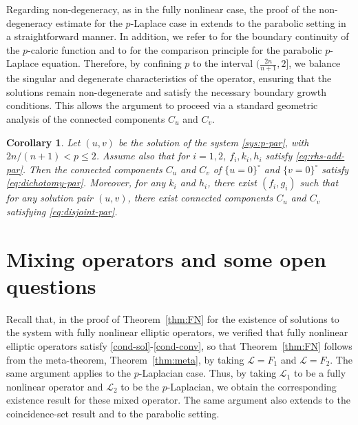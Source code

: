 \documentclass[11pt,oneside,english]{amsart}
\newcommand{\cL}{{\mathcal L}}
\numberwithin{equation}{section}
\theoremstyle{plain}
\newtheorem{corollary}{Corollary}
\numberwithin{equation}{section}
\begin{document}
Regarding non-degeneracy, as in the fully nonlinear case, the proof of the non-degeneracy estimate for the $p$-Laplace case in \cite[(2.14)]{JeoSha24} extends to the parabolic setting in a straightforward manner.
In addition, we refer to \cite[Theorem~1.2 in Chapter {\rm III}]{DiB93} for the boundary continuity of the $p$-caloric function and to \cite[Theorem~3.1 in Chapter {\rm VI}]{DiB93} for the comparison principle for the parabolic $p$-Laplace equation.
Therefore, by confining $p$ to the interval $(\frac{2n}{n+1}, 2]$, we balance the singular and degenerate characteristics of the operator, ensuring that the solutions remain non-degenerate and satisfy the necessary boundary growth conditions. This allows the argument to proceed via a standard geometric analysis of the connected components $C_u$ and $C_v$.






    \begin{corollary}\label{cor:p-par-coin}
  Let $(u,v)$ be the solution of the system \eqref{sys:p-par}, with $ 2n/(n+1)<p\leq 2 $.
 Assume also that for  $i=1,2$, $f_i, k_i,h_i$ satisfy \eqref{eq:rhs-add-par}.  Then the connected components  $C_u$ and $C_v$ of  $\{u=0\}^\circ$ and $\{v=0\}^\circ$ satisfy
  \eqref{eq:dichotomy-par}. Moreover, for any $k_i$ and $h_i$, there exist $(f_i,g_i)$ such that for any solution pair  $(u,v)$, there exist connected components $C_u$ and $C_v$  satisfying \eqref{eq:disjoint-par}.
\end{corollary}




\section{Mixing operators and some open questions}\label{sec:mix}

Recall that, in the proof of Theorem~\ref{thm:FN} for the existence of solutions to the system with fully nonlinear elliptic operators, we verified that fully nonlinear elliptic operators satisfy \ref{cond-sol}-\ref{cond-conv}, so that Theorem~\ref{thm:FN} follows from the meta-theorem, Theorem~\ref{thm:meta}, by taking $\cL=F_1$ and $\cL=F_2$. The same argument applies to the $p$-Laplacian case. Thus, by taking $\cL_1$ to be a fully nonlinear operator and $\cL_2$ to be the $p$-Laplacian, we obtain the corresponding existence result for these mixed operator. The same argument also extends to the coincidence-set result and to the parabolic setting.
\end{document}

